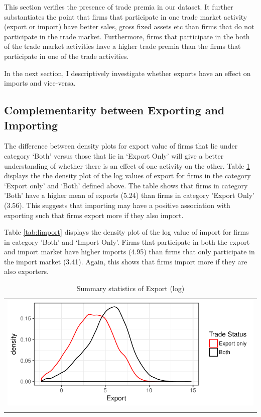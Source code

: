 \documentclass[12pt]{article}
\begin{document}
This section verifies the presence of trade premia in our
dataset. It further substantiates the point that firms that
participate in one trade market activity (export or import) have
better sales, gross fixed assets etc than firms that do not
participate in the trade market. Furthermore, firms that participate
in the both of the trade market activities have a higher trade premia
than the firms that participate in one of the trade activities. 

In the next section, I descriptively investigate whether exports have an effect
on imports and vice-versa.  

\subsection{Complementarity between Exporting and Importing}
The difference between density plots for export value of firms that
lie under category `Both'  versus those that lie in `Export Only' will
give a better understanding of whether there is an effect of one activity on the other. 
Table \ref{tab:lexport} displays the the density plot  of the log
values of export for firms in the category `Export only' and `Both'
defined above. The table shows that firms in category 'Both'
 have a higher mean of exports (5.24) than firms in category 'Export
 Only' (3.56). This suggests that importing may have a
positive association with exporting such that firms export more if
they also import.

Table \ref{tab:limport} displays the density plot of the log value of
import  for firms in category 'Both' and `Import Only'.
Firms that participate in both the
export and import market have higher imports (4.95) than firms that only
participate in the import market (3.41). Again, this shows that firms
import more if they are also exporters. 
\begin{center}
\begin{table}[H]
\caption{Summary statistics of Export (log)}
\label{tab:lexport}
\begin{tabular}{c}
 \includegraphics{./PICS/denslexport.pdf}   \\ 
   \\  
\end{tabular}
\end{table}
\end{center}
\end{document}
